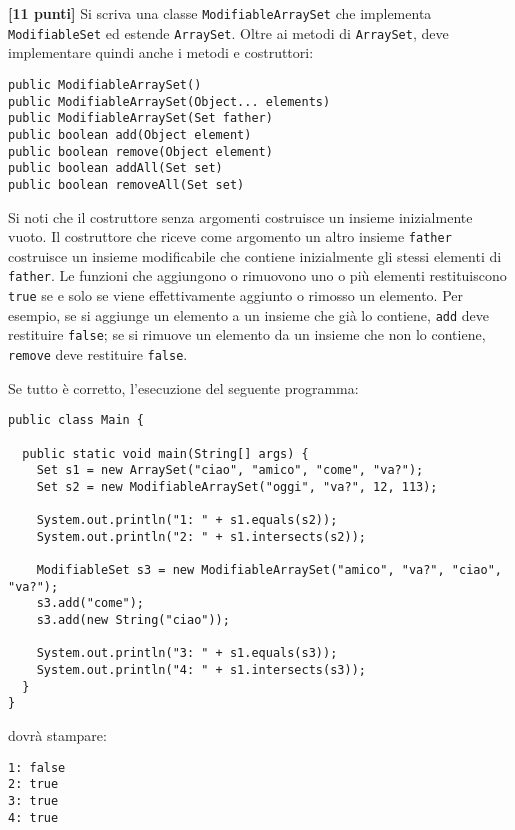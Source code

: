\documentclass{article}[10pt]
\newcounter{esnu}
\newenvironment{esercizio}{\medskip \noindent {\bf Esercizio\addtocounter{esnu}{1} \arabic{esnu}}}{}
\begin{document}
\begin{esercizio}
\textbf{[11 punti]}
Si scriva una classe \texttt{ModifiableArraySet} che implementa \texttt{ModifiableSet} ed estende
\texttt{ArraySet}. Oltre ai metodi di \texttt{ArraySet}, deve implementare quindi anche i metodi
e costruttori:

{\small
\begin{verbatim}
public ModifiableArraySet()
public ModifiableArraySet(Object... elements)
public ModifiableArraySet(Set father)
public boolean add(Object element)
public boolean remove(Object element)
public boolean addAll(Set set)
public boolean removeAll(Set set)
\end{verbatim}}

\noindent
Si noti che il costruttore senza argomenti costruisce un insieme inizialmente vuoto.
Il costruttore che riceve come argomento
un altro insieme \texttt{father} costruisce un insieme modificabile
che contiene inizialmente gli stessi elementi di \texttt{father}.
Le funzioni che aggiungono o rimuovono uno o pi\`u elementi restituiscono \texttt{true} se e solo se
viene effettivamente aggiunto o rimosso un elemento. Per esempio, se si aggiunge un elemento a un insieme
che gi\`a lo contiene, \texttt{add} deve restituire \texttt{false}; se si rimuove un elemento da un
insieme che non lo contiene, \texttt{remove} deve restituire \texttt{false}.
\end{esercizio}

\pagebreak
Se tutto \`e corretto, l'esecuzione del seguente programma:

{\small
\begin{verbatim}
public class Main {

  public static void main(String[] args) {
    Set s1 = new ArraySet("ciao", "amico", "come", "va?");
    Set s2 = new ModifiableArraySet("oggi", "va?", 12, 113);

    System.out.println("1: " + s1.equals(s2));
    System.out.println("2: " + s1.intersects(s2));

    ModifiableSet s3 = new ModifiableArraySet("amico", "va?", "ciao", "va?");
    s3.add("come");
    s3.add(new String("ciao"));

    System.out.println("3: " + s1.equals(s3));
    System.out.println("4: " + s1.intersects(s3));
  }
}
\end{verbatim}
}

\noindent
dovr\`a stampare:

{\small
\begin{verbatim}
1: false
2: true
3: true
4: true
\end{verbatim}
}
\end{document}
